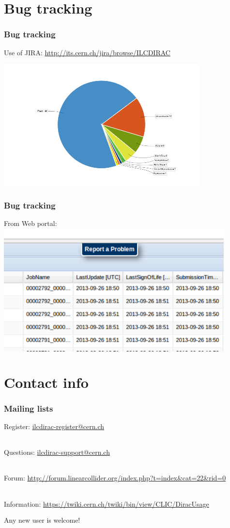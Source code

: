 \documentclass[10pt,table,dvipsnames]{beamer}
\begin{document}
\section{Bug tracking}
\begin{frame}
\frametitle{Bug tracking}
Use of JIRA: \url{http://its.cern.ch/jira/browse/ILCDIRAC}
\begin{center}
\includegraphics[width=0.8\textwidth]{charts_1}
\end{center}
\end{frame}
\begin{frame}
\frametitle{Bug tracking}
From Web portal:
\centering
\includegraphics[width=0.9\textwidth]{ReportProb} 
\end{frame}

\section{Contact info}
\begin{frame}
\frametitle{Mailing lists}
Register: \url{ilcdirac-register@cern.ch}

~\\

Questions: \url{ilcdirac-support@cern.ch}

~\\

Forum: {\small \url{http://forum.linearcollider.org/index.php?t=index&cat=22&rid=0}}

~\\

Information: {\small\url{https://twiki.cern.ch/twiki/bin/view/CLIC/DiracUsage}}
\vfill
\begin{center}
\alert{\Large Any new user is welcome!}
\end{center}

\end{frame} 
\end{document}
